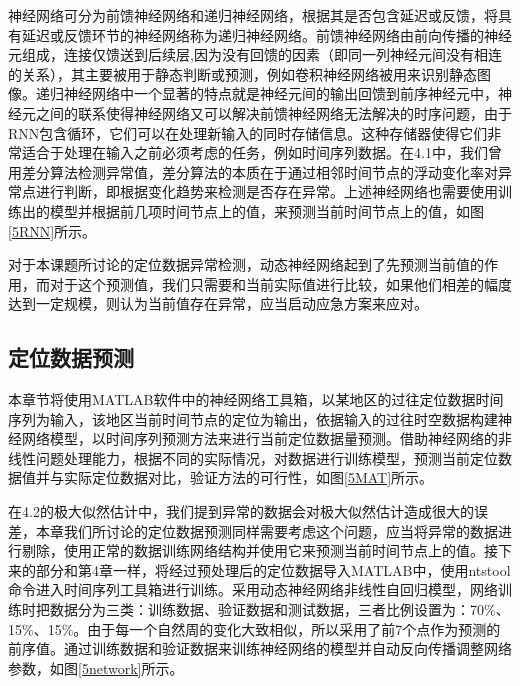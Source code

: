 \documentclass[a4paper,AutoFakeBold,oneside,12pt]{book}
\begin{document}
	神经网络可分为前馈神经网络和递归神经网络，根据其是否包含延迟或反馈，将具有延迟或反馈环节的神经网络称为递归神经网络。前馈神经网络由前向传播的神经元组成\cite{bebis1994feed}，连接仅馈送到后续层,因为没有回馈的因素（即同一列神经元间没有相连的关系），其主要被用于静态判断或预测，例如卷积神经网络被用来识别静态图像。递归神经网络中一个显著的特点就是神经元间的输出回馈到前序神经元中，神经元之间的联系使得神经网络又可以解决前馈神经网络无法解决的时序问题，由于RNN包含循环，它们可以在处理新输入的同时存储信息\cite{medsker2001recurrent}。这种存储器使得它们非常适合于处理在输入之前必须考虑的任务，例如时间序列数据。在4.1中，我们曾用差分算法检测异常值，差分算法的本质在于通过相邻时间节点的浮动变化率对异常点进行判断，即根据变化趋势来检测是否存在异常。上述神经网络也需要使用训练出的模型并根据前几项时间节点上的值，来预测当前时间节点上的值，如图\ref{5RNN}所示。


	对于本课题所讨论的定位数据异常检测，动态神经网络起到了先预测当前值的作用，而对于这个预测值，我们只需要和当前实际值进行比较，如果他们相差的幅度达到一定规模，则认为当前值存在异常，应当启动应急方案来应对。

\subsection{定位数据预测}
	本章节将使用MATLAB软件中的神经网络工具箱，以某地区的过往定位数据时间序列为输入，该地区当前时间节点的定位为输出，依据输入的过往时空数据构建神经网络模型，以时间序列预测方法来进行当前定位数据量预测\cite{韩路跃2005基于}。借助神经网络的非线性问题处理能力，根据不同的实际情况，对数据进行训练模型，预测当前定位数据值并与实际定位数据对比，验证方法的可行性，如图\ref{5MAT}所示。


	在4.2的极大似然估计中，我们提到异常的数据会对极大似然估计造成很大的误差，本章我们所讨论的定位数据预测同样需要考虑这个问题，应当将异常的数据进行剔除，使用正常的数据训练网络结构并使用它来预测当前时间节点上的值。接下来的部分和第4章一样，将经过预处理后的定位数据导入MATLAB中，使用ntstool命令进入时间序列工具箱进行训练。采用动态神经网络非线性自回归模型，网络训练时把数据分为三类：训练数据、验证数据和测试数据，三者比例设置为：70\%、15\%、15\%。由于每一个自然周的变化大致相似，所以采用了前7个点作为预测的前序值。通过训练数据和验证数据来训练神经网络的模型并自动反向传播调整网络参数，如图\ref{5network}所示。
\end{document}
